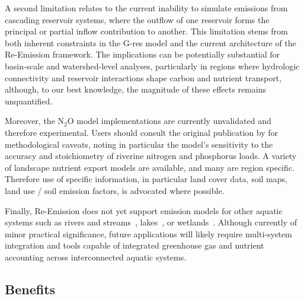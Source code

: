 \documentclass[review, authoryear, 1p]{elsarticle} %
\begin{document}
A second limitation relates to the current inability to simulate emissions from cascading reservoir systems, where the outflow of one reservoir forms the principal or partial inflow contribution to another. 
This limitation stems from both inherent constraints in the G-res model and the current architecture of the Re-Emission framework.
The implications can be potentially substantial for basin-scale and watershed-level analyses, particularly in regions where hydrologic connectivity and reservoir interactions shape carbon and nutrient transport, although, to our best knowledge, the magnitude of these effects remains unquantified.

Moreover, the N$_2$O model implementations are currently unvalidated and therefore experimental.
Users should consult the original publication by \citet{Maavara2019} for methodological caveats, noting in particular the model's sensitivity to the accuracy and stoichiometry of riverine nitrogen and phosphorus loads.
A variety of landscape nutrient export models are available, and many are region specific.
Therefore use of specific information, in particular land cover data, soil maps, land use / soil emission factors, is advocated where possible.

Finally, Re-Emission does not yet support emission models for other aquatic systems such as rivers and streams~\citep{Rocher-Ros2023}, lakes~\citep{Zhuang2023}, or wetlands~\citep{Hu2024}.
Although currently of minor practical significance, future applications will likely require multi-system integration and tools capable of integrated greenhouse gas and nutrient accounting across interconnected aquatic systems.

\subsection{Benefits}
\label{subsec:benefits}
\end{document}
